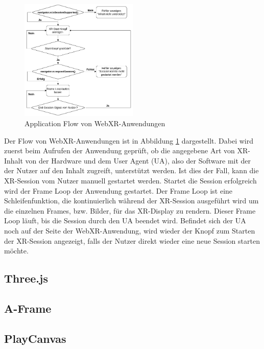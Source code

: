 \begin{figure}[H]
    \centering
    \includegraphics[width=0.5\textwidth]{images/WebXR-App-Flow.png}
    \caption{Application Flow von WebXR-Anwendungen}
    \label{fig:webxr-app-flow}
  \end{figure}

Der Flow von WebXR-Anwendungen ist in Abbildung \ref{fig:webxr-app-flow} dargestellt.
Dabei wird zuerst beim Aufrufen der Anwendung geprüft, ob die angegebene Art von XR-Inhalt von der Hardware und dem User Agent (UA), also der Software mit der der Nutzer auf den Inhalt zugreift, unterstützt werden.
Ist dies der Fall, kann die XR-Session vom Nutzer manuell gestartet werden.
Startet die Session erfolgreich wird der Frame Loop der Anwendung gestartet.
Der Frame Loop ist eine Schleifenfunktion, die kontinuierlich während der XR-Session ausgeführt wird um die einzelnen Frames, bzw. Bilder, für das XR-Display zu rendern.
Dieser Frame Loop läuft, bis die Session durch den UA beendet wird.
Befindet sich der UA noch auf der Seite der WebXR-Anwendung, wird wieder der Knopf zum Starten der XR-Session angezeigt, falls der Nutzer direkt wieder eine neue Session starten möchte.

\subsection{Three.js}

\subsection{A-Frame}

\subsection{PlayCanvas}

